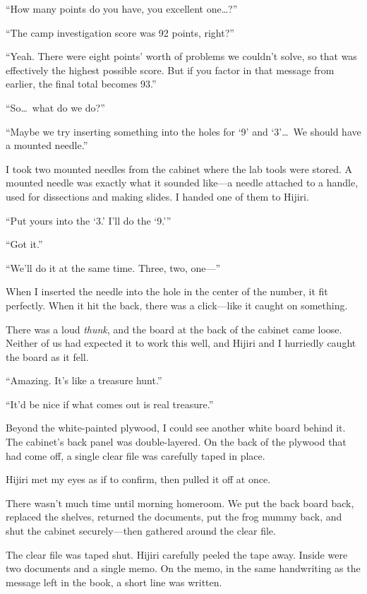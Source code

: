 \documentclass[
    a4paper,
    12pt,
    twoside,
    openany,
    UTF8,
    fontset=windows
]{ctexbook}
\begin{document}
``How many points do you have, you excellent one\dots?''

``The camp investigation score was 92 points, right?''

``Yeah. There were eight points' worth of problems we couldn't solve, so that was effectively the highest possible score. But if you factor in that message from earlier, the final total becomes 93.''

``So\dots\ what do we do?''

``Maybe we try inserting something into the holes for `9' and `3'\dots\ We should have a mounted needle.''

I took two mounted needles from the cabinet where the lab tools were stored. A mounted needle was exactly what it sounded like---a needle attached to a handle, used for dissections and making slides. I handed one of them to Hijiri.

``Put yours into the `3.' I'll do the `9.'''

``Got it.''

``We'll do it at the same time. Three, two, one---''

When I inserted the needle into the hole in the center of the number, it fit perfectly. When it hit the back, there was a click---like it caught on something.

There was a loud \textit{thunk}, and the board at the back of the cabinet came loose. Neither of us had expected it to work this well, and Hijiri and I hurriedly caught the board as it fell.

``Amazing. It's like a treasure hunt.''

``It'd be nice if what comes out is real treasure.''

Beyond the white-painted plywood, I could see another white board behind it. The cabinet's back panel was double-layered. On the back of the plywood that had come off, a single clear file was carefully taped in place.

Hijiri met my eyes as if to confirm, then pulled it off at once.

There wasn't much time until morning homeroom. We put the back board back, replaced the shelves, returned the documents, put the frog mummy back, and shut the cabinet securely---then gathered around the clear file.

The clear file was taped shut. Hijiri carefully peeled the tape away.
Inside were two documents and a single memo. On the memo, in the same handwriting as the message left in the book, a short line was written.
\end{document}
